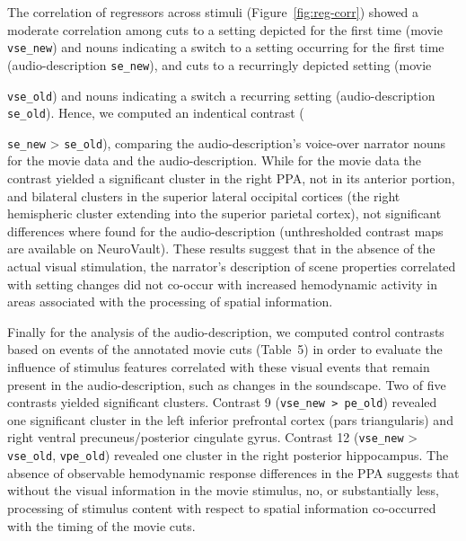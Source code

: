 \documentclass[english,11pt]{article}
\begin{document}
The correlation of regressors across stimuli (Figure~\ref{fig:reg-corr}) showed
a moderate correlation among cuts to a setting depicted for the first time
(movie \texttt{vse\_new}) and nouns indicating a switch to a setting occurring
for the first time (audio-description \texttt{se\_new}), and cuts to a
recurringly depicted setting (movie {\texttt{vse\_old}) and nouns indicating a
switch a recurring setting (audio-description \texttt{se\_old}).
%
Hence, we computed an indentical contrast ({\texttt{se\_new} >
\texttt{se\_old}), comparing the audio-description's voice-over narrator nouns
for the movie data and the audio-description.
While for the movie data the contrast yielded a significant cluster in the right
PPA, not in its anterior portion, and bilateral clusters in the superior lateral
occipital cortices (the right hemispheric cluster extending into the superior
parietal cortex), not significant differences where found for the
audio-description (unthresholded contrast maps are available on NeuroVault).
%
These results suggest that in the absence of the actual visual stimulation, the
narrator's description of scene properties correlated with setting changes did
not co-occur with increased hemodynamic activity in areas associated with the
processing of spatial information.

Finally for the analysis of the audio-description, we computed control contrasts
based on events of the annotated movie cuts (Table~5) in order
to evaluate the influence of stimulus features correlated with these visual
events that remain present in the audio-description, such as changes in the
soundscape.
Two of five contrasts yielded significant clusters.
Contrast 9 (\texttt{vse\_new > pe\_old}) revealed one significant cluster in the
left inferior prefrontal cortex (pars triangularis) and right ventral
precuneus/posterior cingulate gyrus.
Contrast 12 (\texttt{vse\_new} > \texttt{vse\_old}, \texttt{vpe\_old}) revealed
one cluster in the right posterior hippocampus.
%
The absence of observable hemodynamic response differences in the PPA suggests
that without the visual information in the movie stimulus, no, or substantially
less, processing of stimulus content with respect to spatial information
co-occurred with the timing of the movie cuts.


{\small
}

}}
\end{document}
